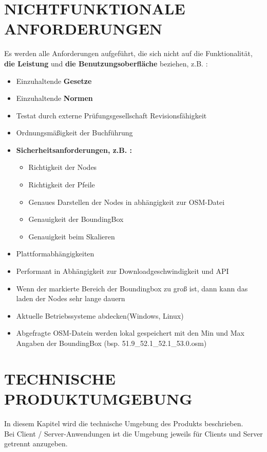 	
	\section{\Large NICHTFUNKTIONALE ANFORDERUNGEN}
	Es werden alle Anforderungen aufgeführt, die sich nicht auf die Funktionalität, \textbf{ die Leistung} und \textbf{ die Benutzungsoberfläche} beziehen, z.B. :
	\begin{itemize}
		\item Einzuhaltende \textbf{Gesetze}
		\item Einzuhaltende \textbf{Normen}
		\item Testat durch externe Prüfungsgesellschaft
		Revisionsfähigkeit 
		\item Ordnungsmäßigkeit der Buchführung
		\item \textbf{ Sicherheitsanforderungen, z.B. :}
		\begin{itemize}
			\item Richtigkeit der Nodes
			\item Richtigkeit der Pfeile
			\item Genaues Darstellen der Nodes in abhängigkeit zur OSM-Datei
			\item Genauigkeit der BoundingBox
			\item Genauigkeit beim Skalieren
		\end{itemize}  
		\item Plattformabhängigkeiten
		\item Performant in Abhängigkeit zur Downloadgeschwindigkeit und API
		\item Wenn der markierte Bereich der Boundingbox zu groß ist, dann kann das laden der Nodes sehr lange dauern
		\item Aktuelle Betriebssysteme abdecken(Windows, Linux)
		\item Abgefragte OSM-Datein werden lokal gespeichert mit den Min und Max Angaben der BoundingBox	(bsp. 51.9\_52.1\_52.1\_53.0.osm) 
	\end{itemize} 

	
	\section{\Large TECHNISCHE PRODUKTUMGEBUNG}
   	In diesem Kapitel wird die technische Umgebung des Produkts beschrieben.\\
   	Bei Client / Server-Anwendungen ist die Umgebung jeweils für Clients und Server getrennt anzugeben.
